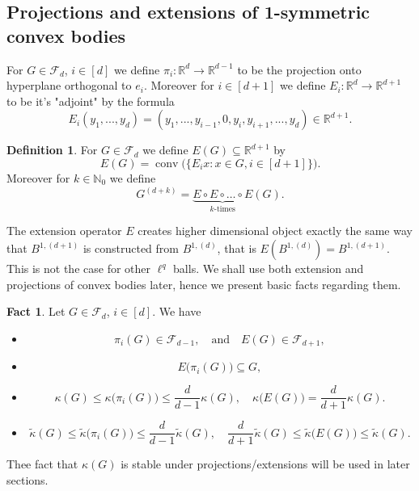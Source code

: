\documentclass[a4paper,oneside, reqno]{amsart}
\numberwithin{equation}{section}
\theoremstyle{definition}%
\theoremstyle{definition}
\newtheorem{Defn}[Thm]{Definition}
\newtheorem{Fact}[Thm]{Fact}
\theoremstyle{definition}%
\theoremstyle{definition}
\newcommand{\R}{\mathbb{R}}
\newcommand{\N}{\mathbb{N}}
\DeclareMathOperator{\conv}{conv}
\begin{document}
\subsection{Projections and extensions of 1-symmetric convex bodies}
For $G \in \mathcal{F}_d$, $i \in [d]$ we define $\pi_i: \R^d \to \R^{d-1}$ to be the projection onto hyperplane orthogonal to $e_i$. Moreover for $i \in [d+1]$ we define $E_i: \R^{d} \to \R^{d+1}$ to be it's "adjoint" by the formula
\[
E_i(y_1,...,y_{d})=(y_1,...,y_{i-1},0,y_i,y_{i+1},...,y_{d}) \in \R^{d+1}.
\]
\begin{Defn}
For $G \in \mathcal{F}_d$ we define $E(G) \subseteq \R^{d+1}$ by
\[
E(G)= \conv\Big( \Big\lbrace E_ix : x \in G, i \in [d+1] \Big\} \Big).
\]
Moreover for $k \in \N_0$ we define 
\[
G^{(d+k)}=\underbrace{E \circ E \circ \ldots \circ E}_{k\text{-times}} (G).
\]
\end{Defn}
The extension operator $E$ creates higher dimensional object exactly the same way that $B^{1,(d+1)}$ is constructed from $B^{1,(d)}$, that is $E(B^{1,(d)})=B^{1,(d+1)}$. This is not the case for other $\ell^q$ balls. We shall use both extension and projections of convex bodies later, hence we present basic facts regarding them.
\begin{Fact} \label{fact about proj and ext}
 Let $G \in \mathcal{F}_d$, $i \in [d]$. We have
 \begin{itemize}
     \item 
     \[
     \pi_i(G) \in \mathcal{F}_{d-1}, \quad \text{and} \quad E(G) \in \mathcal{F}_{d+1},
     \]
     \item 
     \[
     E\big(\pi_i(G) \big) \subseteq G,
     \]
     \item 
     \[
     \kappa(G) \le \kappa\big(\pi_i(G)\big) \le \frac{d}{d-1} \kappa(G), \quad \kappa\big(E(G)\big)= \frac{d}{d+1} \kappa(G).
     \]
     \item \[
     \widetilde{\kappa}(G) \le \widetilde{\kappa}\big(\pi_i(G)\big) \le \frac{d}{d-1} \widetilde{\kappa}(G), \quad  \frac{d}{d+1} \widetilde{\kappa}(G) \le \widetilde{\kappa}\big(E(G)\big) \le \widetilde{\kappa}(G).
     \]
 \end{itemize}
\end{Fact}
Thee fact that $\kappa(G)$ is stable under projections/extensions will be used in later sections.
\end{document}
